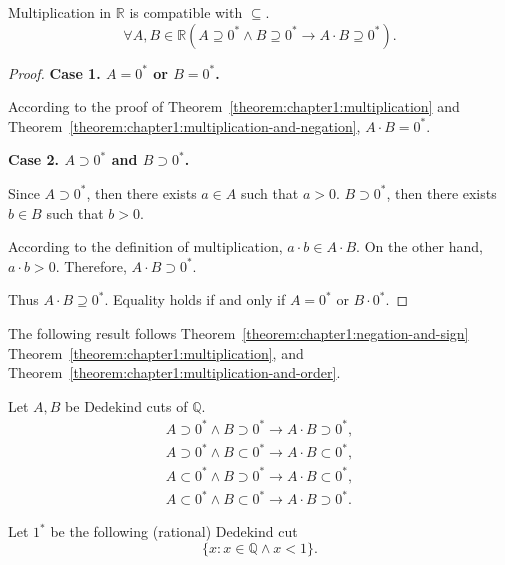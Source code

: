 \begin{theorem}\label{theorem:chapter1:multiplication-and-order}
    Multiplication in $\mathbb{R}$ is compatible with $\subseteq$.
    \[
        \forall A, B\in\mathbb{R}(A\supseteq {0}^{*}\land B\supseteq {0}^{*}\rightarrow A\cdot B\supseteq {0}^{*}).
    \]
\end{theorem}

\begin{proof}
    \textbf{Case 1. $A = {0}^{*}$ or $B = {0}^{*}$.}

    According to the proof of Theorem~\ref{theorem:chapter1:multiplication} and Theorem~\ref{theorem:chapter1:multiplication-and-negation}, $A\cdot B = {0}^{*}$.
    \bigskip

    \textbf{Case 2. $A\supset {0}^{*}$ and $B\supset {0}^{*}$.}

    Since $A\supset {0}^{*}$, then there exists $a\in A$ such that $a > 0$. $B\supset {0}^{*}$, then there exists $b\in B$ such that $b > 0$.

    According to the definition of multiplication, $a\cdot b\in A\cdot B$. On the other hand, $a\cdot b > 0$. Therefore, $A\cdot B\supset {0}^{*}$.

    Thus $A\cdot B\supseteq {0}^{*}$. Equality holds if and only if $A = {0}^{*}$ or $B\cdot {0}^{*}$.
\end{proof}

The following result follows Theorem~\ref{theorem:chapter1:negation-and-sign} Theorem~\ref{theorem:chapter1:multiplication}, and Theorem~\ref{theorem:chapter1:multiplication-and-order}.

\begin{corollary}
    Let $A, B$ be Dedekind cuts of $\mathbb{Q}$.
    \[
        \begin{split}
            A\supset {0}^{*}\land B\supset {0}^{*}\rightarrow A\cdot B\supset {0}^{*}, \\
            A\supset {0}^{*}\land B\subset {0}^{*}\rightarrow A\cdot B\subset {0}^{*}, \\
            A\subset {0}^{*}\land B\supset {0}^{*}\rightarrow A\cdot B\subset {0}^{*}, \\
            A\subset {0}^{*}\land B\subset {0}^{*}\rightarrow A\cdot B\supset {0}^{*}.
        \end{split}
    \]
\end{corollary}

Let ${1}^{*}$ be the following (rational) Dedekind cut
\[
    \{ x: x\in\mathbb{Q}\land x < 1 \}.
\]

